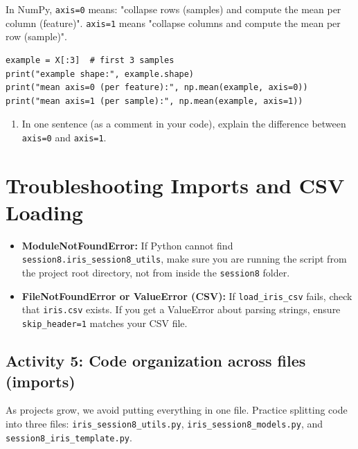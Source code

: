 \noindent
In NumPy, \texttt{axis=0} means: "collapse rows (samples) and compute the mean per column (feature)". \texttt{axis=1} means "collapse columns and compute the mean per row (sample)".

\begin{verbatim}
example = X[:3]  # first 3 samples
print("example shape:", example.shape)
print("mean axis=0 (per feature):", np.mean(example, axis=0))
print("mean axis=1 (per sample):", np.mean(example, axis=1))
\end{verbatim}

\begin{tcolorbox}[title=Do: Your Task]
\begin{enumerate}
    \item In one sentence (as a comment in your code), explain the difference between \texttt{axis=0} and \texttt{axis=1}.
\end{enumerate}
\end{tcolorbox}

\newpage

\section{Troubleshooting Imports and CSV Loading}
\begin{tcolorbox}[title=Common Mistakes \& Troubleshooting]
\begin{itemize}
    \item \textbf{ModuleNotFoundError:} If Python cannot find \texttt{session8.iris\_session8\_utils}, make sure you are running the script from the project root directory, not from inside the \texttt{session8} folder.
    \item \textbf{FileNotFoundError or ValueError (CSV):} If \texttt{load\_iris\_csv} fails, check that \texttt{iris.csv} exists. If you get a ValueError about parsing strings, ensure \texttt{skip\_header=1} matches your CSV file.
\end{itemize}
\end{tcolorbox}

\subsection{Activity 5: Code organization across files (imports)}

\noindent
As projects grow, we avoid putting everything in one file. Practice splitting code into three files: \texttt{iris\_session8\_utils.py}, \texttt{iris\_session8\_models.py}, and \texttt{session8\_iris\_template.py}.

